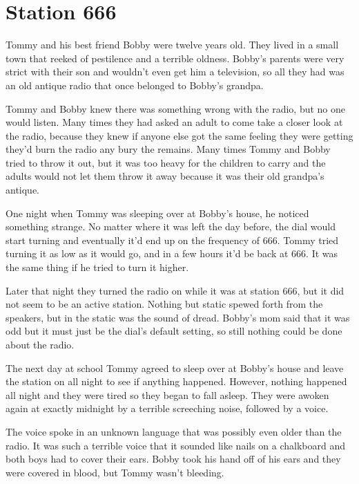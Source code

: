 

\chapter{Station 666}



Tommy and his best friend Bobby were twelve years old. They lived
in a small town that reeked of pestilence and a terrible oldness.
Bobby's parents were very strict with their son and
wouldn't even get him a television, so all they had was an
old antique radio that once belonged to Bobby's
grandpa.



Tommy and Bobby knew there was something wrong with the radio, but
no one would listen. Many times they had asked an adult to come
take a closer look at the radio, because they knew if anyone else
got the same feeling they were getting they'd burn the radio
any bury the remains. Many times Tommy and Bobby tried to throw it
out, but it was too heavy for the children to carry and the adults
would not let them throw it away because it was their old
grandpa's antique.



One night when Tommy was sleeping over at Bobby's house, he
noticed something strange. No matter where it was left the day
before, the dial would start turning and eventually it'd end
up on the frequency of 666. Tommy tried turning it as low as it
would go, and in a few hours it'd be back at 666. It was the
same thing if he tried to turn it higher.



Later that night they turned the radio on while it was at station
666, but it did not seem to be an active station. Nothing but
static spewed forth from the speakers, but in the static was the
sound of dread. Bobby's mom said that it was odd but it must
just be the dial's default setting, so still nothing could be
done about the radio.



The next day at school Tommy agreed to sleep over at Bobby's
house and leave the station on all night to see if anything
happened. However, nothing happened all night and they were tired
so they began to fall asleep. They were awoken again at exactly
midnight by a terrible screeching noise, followed by a voice.



The voice spoke in an unknown language that was possibly even older
than the radio. It was such a terrible voice that it sounded like
nails on a chalkboard and both boys had to cover their ears. Bobby
took his hand off of his ears and they were covered in blood, but
Tommy wasn't bleeding.



